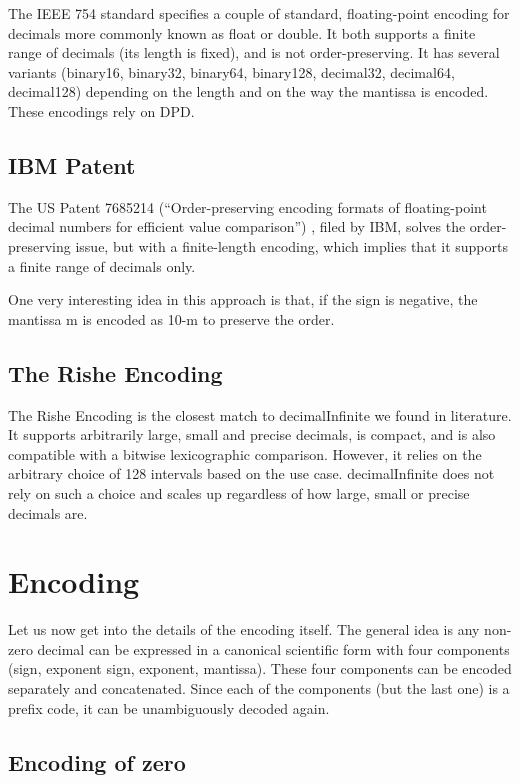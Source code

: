 \documentclass{acm_proc_article-sp}
\begin{document}
The IEEE 754 standard specifies a couple of standard, floating-point encoding for decimals more commonly known as float or double. It both supports a finite range of decimals (its length is fixed), and is not order-preserving. It has several variants (binary16, binary32, binary64, binary128, decimal32, decimal64, decimal128) depending on the length and on the way the mantissa is encoded. These encodings rely on DPD.

\subsection{IBM Patent}
The US Patent 7685214 (``Order-preserving encoding formats of floating-point decimal numbers for efficient value comparison'') , filed by IBM, solves the order-preserving issue, but with a finite-length encoding, which implies that it supports a finite range of decimals only.

One very interesting idea in this approach is that, if the sign is negative, the mantissa m is encoded as 10-m to preserve the order.

\subsection{The Rishe Encoding}

The Rishe Encoding \cite{Rishe1992} is the closest match to decimalInfinite we found in literature. It supports arbitrarily large, small and precise decimals, is compact, and is also compatible with a bitwise lexicographic comparison. However, it relies on the arbitrary choice of 128 intervals based on the use case. decimalInfinite does not rely on such a choice and scales up regardless of how large, small or precise decimals are.

\section{Encoding}
\label{section-encoding}
Let us now get into the details of the encoding itself. The general idea is any non-zero decimal can be expressed in a canonical scientific form with four components (sign, exponent sign, exponent, mantissa). These four components can be encoded separately and concatenated. Since each of the components (but the last one) is a prefix code, it can be unambiguously decoded again.

\subsection{Encoding of zero}
\end{document}
